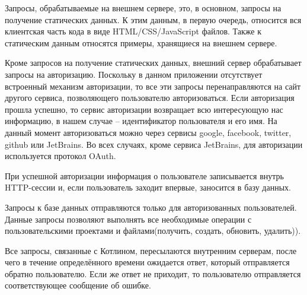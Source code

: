 	Запросы, обрабатываемые на внешнем сервере, это, в основном, запросы на получение статических данных. К этим данным, в первую очередь, относится вся клиентская часть кода в виде HTML/CSS/JavaScript файлов. Также к статическим данным относятся примеры, хранящиеся на внешнем сервере.
	
	Кроме запросов на получение статических данных, внешний сервер обрабатывает запросы на авторизацию. Поскольку в данном приложении отсутствует встроенный механизм авторизации, то все эти запросы перенаправляются на сайт другого сервиса, позволяющего пользователю авторизоваться. Если авторизация прошла успешно, то сервис авторизации возвращает всю интересующую нас информацию, в нашем случае -- идентификатор пользователя и его имя. На данный момент авторизоваться можно через сервисы google, facebook, twitter, github или JetBrains. Во всех случаях, кроме сервиса JetBrains, для авторизации используется протокол OAuth.
	
	
	При успешной авторизации информация о пользователе записывается внутрь HTTP-сессии и, если пользователь заходит впервые, заносится в базу данных.
	
	
	Запросы к базе данных отправляются только для авторизованных пользователей. Данные запросы позволяют выполнять все необходимые операции с пользовательскими проектами и файлами(получить, создать, обновить, удалить)).
	
	Все запросы, связанные с Котлином, пересылаются внутренним серверам, после чего в течение определённого времени ожидается ответ, который отправляется обратно пользователю. Если же ответ не приходит, то пользователю отправляется соответствующее сообщение об ошибке.
	
	

